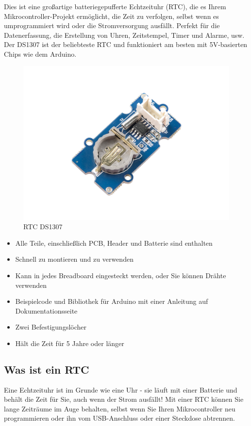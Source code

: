 \documentclass[conference]{IEEEtran}
\begin{document}
Dies ist eine großartige batteriegepufferte Echtzeituhr (RTC), die es Ihrem Mikrocontroller-Projekt ermöglicht, die Zeit zu verfolgen, selbst wenn es umprogrammiert wird oder die Stromversorgung ausfällt. Perfekt für die Datenerfassung, die Erstellung von Uhren, Zeitstempel, Timer und Alarme, usw. Der DS1307 ist der beliebteste RTC und funktioniert am besten mit 5V-basierten Chips wie dem Arduino.

\begin{figure}
	\begin{center}
		\includegraphics[scale=0.45]{rtc1}
	\end{center}
	\caption{RTC DS1307}
\end{figure}

\begin{itemize}
	\item Alle Teile, einschließlich PCB, Header und Batterie sind enthalten
	\item Schnell zu montieren und zu verwenden
	\item Kann in jedes Breadboard eingesteckt werden, oder Sie können Drähte verwenden
	\item Beispielcode und Bibliothek für Arduino mit einer Anleitung auf  Dokumentationsseite
	\item Zwei Befestigungslöcher
	\item Hält die Zeit für 5 Jahre oder länger
\end{itemize}


\subsection{Was ist ein RTC}
Eine Echtzeituhr ist im Grunde wie eine Uhr - sie läuft mit einer Batterie und behält die Zeit für Sie, auch wenn der Strom ausfällt! Mit einer RTC können Sie lange Zeiträume im Auge behalten, selbst wenn Sie Ihren Mikrocontroller neu programmieren oder ihn vom USB-Anschluss oder einer Steckdose abtrennen.
\end{document}

